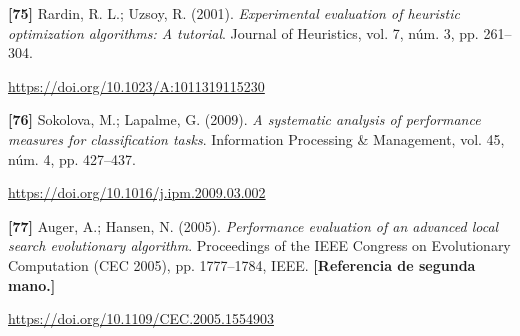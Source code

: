 \documentclass[11pt,a4paper]{article}
\newcommand{\referencia}[1]{\par\addvspace{0.8\baselineskip}\noindent\hangindent=1.1cm\hangafter=1 #1\par\nopagebreak}
\begin{document}
\begin{samepage}
\referencia{\textbf{[75]} Rardin, R. L.; Uzsoy, R. (2001). \textit{Experimental evaluation of heuristic optimization algorithms: A tutorial}. Journal of Heuristics, vol. 7, núm. 3, pp. 261--304.}
 {\small\url{https://doi.org/10.1023/A:1011319115230}}\par
\end{samepage}
\begin{samepage}
\referencia{\textbf{[76]} Sokolova, M.; Lapalme, G. (2009). \textit{A systematic analysis of performance measures for classification tasks}. Information Processing \& Management, vol. 45, núm. 4, pp. 427--437.}
 {\small\url{https://doi.org/10.1016/j.ipm.2009.03.002}}\par
\end{samepage}
\begin{samepage}
\referencia{\textbf{[77]} Auger, A.; Hansen, N. (2005). \textit{Performance evaluation of an advanced local search evolutionary algorithm}. Proceedings of the {IEEE} Congress on Evolutionary Computation ({CEC} 2005), pp. 1777--1784, IEEE. \textbf{[Referencia de segunda mano.]}}
 {\small\url{https://doi.org/10.1109/CEC.2005.1554903}}\par
\end{samepage}
\end{document}
